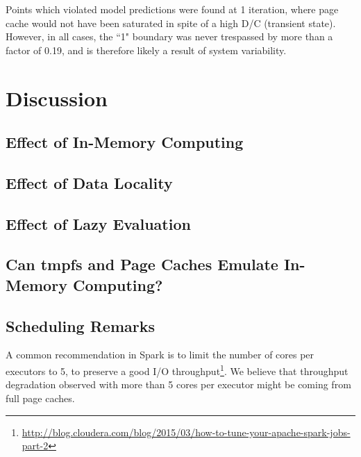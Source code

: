 \documentclass{IEEEtran}
\begin{document}
Points which violated 
model predictions were found at 1 iteration, where page cache would not 
have been saturated in spite of a high D/C (transient state). However, 
in all cases, the ``1" boundary was never trespassed by more than a 
factor of 0.19, and is therefore likely a result of system variability.

\section{Discussion} %
\label{sec:discussion}
\subsection{Effect of In-Memory Computing}

\subsection{Effect of Data Locality}

\subsection{Effect of Lazy Evaluation}


\subsection{Can tmpfs and Page Caches Emulate In-Memory Computing?}


\subsection{Scheduling Remarks}


A common recommendation in Spark is to limit the number of cores per 
executors to 5, to preserve a good I/O 
throughput\footnote{\url{http://blog.cloudera.com/blog/2015/03/how-to-tune-your-apache-spark-jobs-part-2}}. 
We believe that throughput degradation observed with more than 5 cores 
per executor might be coming from full page caches.
\end{document}
